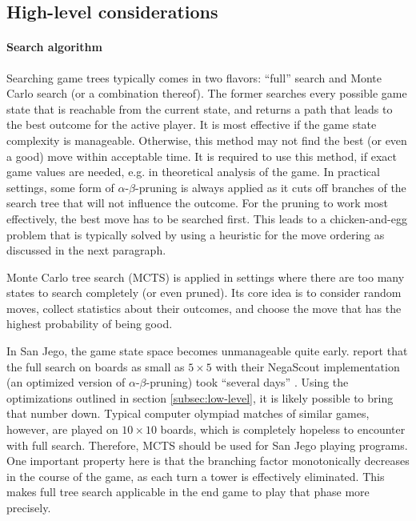 \documentclass[sigconf]{acmart}
\begin{document}
\subsection{High-level considerations}
\paragraph{Search algorithm}
Searching game trees typically comes in two flavors:
\enquote{full} search and Monte Carlo search (or a combination thereof).
The former searches every possible game state that is reachable from the current state, and returns a path that leads to the best outcome for the active player.
It is most effective if the game state complexity is manageable.
Otherwise, this method may not find the best (or even a good) move within acceptable time.
It is required to use this method, if exact game values are needed, e.g. in theoretical analysis of the game.
In practical settings, some form of $\alpha$-$\beta$-pruning is always applied as it cuts off branches of the search tree that will not influence the outcome.
For the pruning to work most effectively, the best move has to be searched first.
This leads to a chicken-and-egg problem that is typically solved by using a heuristic for the move ordering as discussed in the next paragraph.

Monte Carlo tree search (MCTS) is applied in settings where there are too many states to search completely (or even pruned).
Its core idea is to consider random moves, collect statistics about their outcomes, and choose the move that has the highest probability of being good.

In San Jego, the game state space becomes unmanageable quite early.
\citeauthor{Althöfer2020} report that the full search on boards as small as $5\times5$ with their NegaScout implementation (an optimized version of $\alpha$-$\beta$-pruning) took \enquote{several days} \cite[p.~8]{Althöfer2020}.
Using the optimizations outlined in section \ref{subsec:low-level}, it is likely possible to bring that number down.
Typical computer olympiad matches of similar games, however, are played on $10\times10$ boards, which is completely hopeless to encounter with full search.
Therefore, MCTS should be used for San Jego playing programs.
One important property here is that the branching factor monotonically decreases in the course of the game, as each turn a tower is effectively eliminated.
This makes full tree search applicable in the end game to play that phase more precisely.
\end{document}
